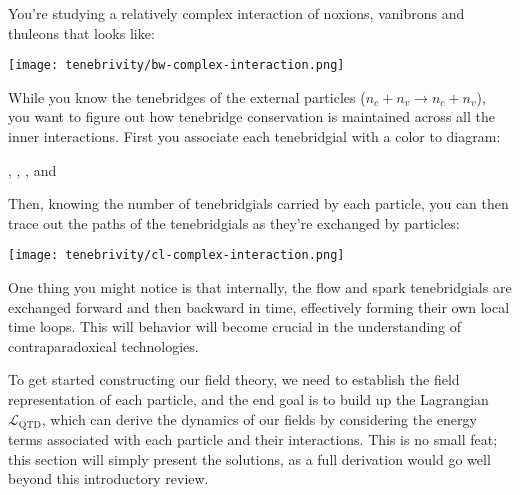 \begin{example}
  You're studying a relatively complex interaction of noxions, vanibrons and thuleons that looks like:
  \begin{center}
    \texttt{[image: tenebrivity/bw-complex-interaction.png]}
  \end{center}
  While you know the tenebridges of the external particles (\(n_c + n_v \rightarrow n_c + n_v\)), you want to figure out how tenebridge conservation is maintained across all the inner interactions. First you associate each tenebridgial with a color to diagram:
  \begin{center}
    , , , and 
  \end{center}
  Then, knowing the number of tenebridgials carried by each particle, you can then trace out the paths of the tenebridgials as they're exchanged by particles:
  \begin{center}
    \texttt{[image: tenebrivity/cl-complex-interaction.png]}
  \end{center}
  One thing you might notice is that internally, the flow and spark tenebridgials are exchanged forward and then backward in time, effectively forming their own local time loops. This will behavior will become crucial in the understanding of contraparadoxical technologies.
\end{example}


To get started constructing our field theory, we need to establish the field representation of each particle, and the end goal is to build up the Lagrangian \(\mathcal{L}_{\text{QTD}}\), which can derive the dynamics of our fields by considering the energy terms associated with each particle and their interactions. This is no small feat; this section will simply present the solutions, as a full derivation would go well beyond this introductory review.

